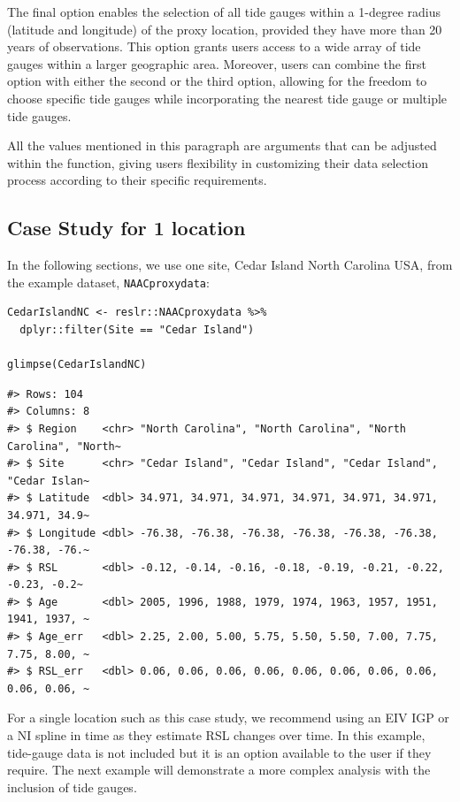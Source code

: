 The final option enables the selection of all tide gauges within a 1-degree radius (latitude and longitude) of the proxy location, provided they have more than 20 years of observations. This option grants users access to a wide array of tide gauges within a larger geographic area. Moreover, users can combine the first option with either the second or the third option, allowing for the freedom to choose specific tide gauges while incorporating the nearest tide gauge or multiple tide gauges.

All the values mentioned in this paragraph are arguments that can be adjusted within the function, giving users flexibility in customizing their data selection process according to their specific requirements.

\hypertarget{casestudy1}{%
\subsection{Case Study for 1 location}\label{casestudy1}}

In the following sections, we use one site, Cedar Island North Carolina USA, from the example dataset, \texttt{NAACproxydata}:
\scriptsize

\begin{verbatim}
CedarIslandNC <- reslr::NAACproxydata %>% 
  dplyr::filter(Site == "Cedar Island")

glimpse(CedarIslandNC)
\end{verbatim}

\begin{verbatim}
#> Rows: 104
#> Columns: 8
#> $ Region    <chr> "North Carolina", "North Carolina", "North Carolina", "North~
#> $ Site      <chr> "Cedar Island", "Cedar Island", "Cedar Island", "Cedar Islan~
#> $ Latitude  <dbl> 34.971, 34.971, 34.971, 34.971, 34.971, 34.971, 34.971, 34.9~
#> $ Longitude <dbl> -76.38, -76.38, -76.38, -76.38, -76.38, -76.38, -76.38, -76.~
#> $ RSL       <dbl> -0.12, -0.14, -0.16, -0.18, -0.19, -0.21, -0.22, -0.23, -0.2~
#> $ Age       <dbl> 2005, 1996, 1988, 1979, 1974, 1963, 1957, 1951, 1941, 1937, ~
#> $ Age_err   <dbl> 2.25, 2.00, 5.00, 5.75, 5.50, 5.50, 7.00, 7.75, 7.75, 8.00, ~
#> $ RSL_err   <dbl> 0.06, 0.06, 0.06, 0.06, 0.06, 0.06, 0.06, 0.06, 0.06, 0.06, ~
\end{verbatim}

\normalsize

For a single location such as this case study, we recommend using an EIV IGP or a NI spline in time as they estimate RSL changes over time. In this example, tide-gauge data is not included but it is an option available to the user if they require. The next example will demonstrate a more complex analysis with the inclusion of tide gauges.

